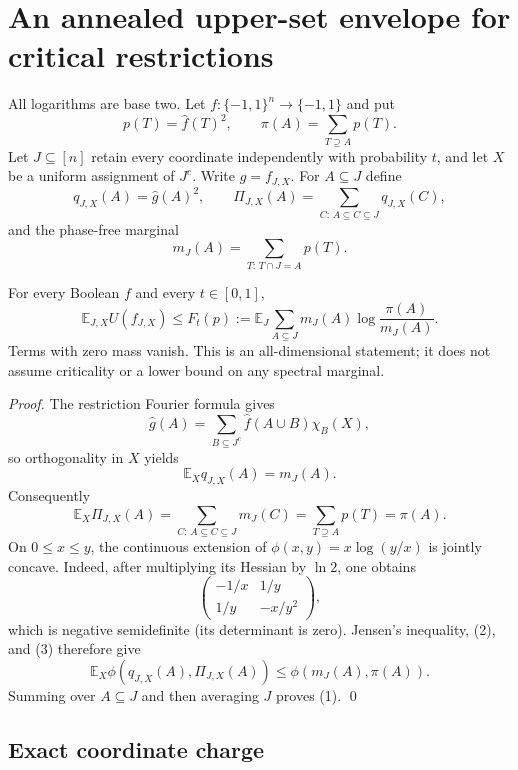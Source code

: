 \section*{An annealed upper-set envelope for critical restrictions}

All logarithms are base two.  Let $f:\{-1,1\}^n\to\{-1,1\}$ and put
\[
 p(T)=\widehat f(T)^2,\qquad
 \pi(A)=\sum_{T\supseteq A}p(T).
\]
Let $J\subseteq[n]$ retain every coordinate independently with probability
$t$, and let $X$ be a uniform assignment of $J^c$.  Write
$g=f_{J,X}$.  For $A\subseteq J$ define
\[
 q_{J,X}(A)=\widehat g(A)^2,\qquad
 \Pi_{J,X}(A)=\sum_{C:\,A\subseteq C\subseteq J}q_{J,X}(C),
\]
and the phase-free marginal
\[
 m_J(A)=\sum_{T:\,T\cap J=A}p(T).
\]

\begin{theorem}
For every Boolean $f$ and every $t\in[0,1]$,
\[
 \boxed{\quad
 \mathbb E_{J,X}U(f_{J,X})\le F_t(p):=
 \mathbb E_J\sum_{A\subseteq J}m_J(A)
       \log\frac{\pi(A)}{m_J(A)}.\quad}                 \tag{1}
\]
Terms with zero mass vanish.  This is an all-dimensional statement; it does
not assume criticality or a lower bound on any spectral marginal.
\end{theorem}

\begin{proof}
The restriction Fourier formula gives
\[
 \widehat g(A)=\sum_{B\subseteq J^c}\widehat f(A\cup B)\chi_B(X),
\]
so orthogonality in $X$ yields
\[
 \mathbb E_Xq_{J,X}(A)=m_J(A).                           \tag{2}
\]
Consequently
\[
 \mathbb E_X\Pi_{J,X}(A)
 =\sum_{C:\,A\subseteq C\subseteq J}m_J(C)
 =\sum_{T\supseteq A}p(T)=\pi(A).                       \tag{3}
\]
On $0\le x\le y$, the continuous extension of
$\phi(x,y)=x\log(y/x)$ is jointly concave.  Indeed, after multiplying its
Hessian by $\ln2$, one obtains
\[
 \begin{pmatrix}-1/x&1/y\\1/y&-x/y^2\end{pmatrix},
\]
which is negative semidefinite (its determinant is zero).  Jensen's inequality,
(2), and (3) therefore give
\[
 \mathbb E_X\phi(q_{J,X}(A),\Pi_{J,X}(A))
 \le\phi(m_J(A),\pi(A)).
\]
Summing over $A\subseteq J$ and then averaging $J$ proves (1). \qed
\end{proof}

\subsection*{Exact coordinate charge}

